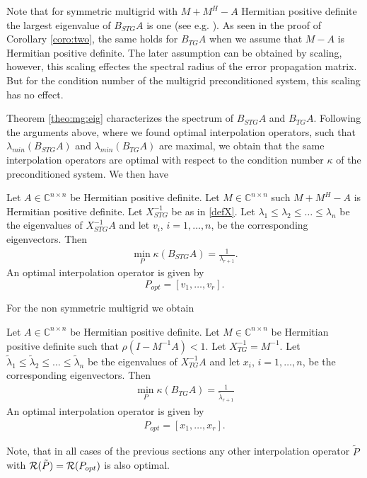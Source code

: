 \documentclass[final]{siamltex}
\newcommand{\beqo}{\begin{eqnarray*}}
\newcommand{\beq}{\begin{eqnarray}}
\newcommand{\eeqo}{\end{eqnarray*}}
\newcommand{\eeq}{\end{eqnarray}}
\numberwithin{equation}{section}
\newcommand{\ran} {{\cal R}}
\newcommand{\inCnn}{\in \mathbb{C}^{n \times n}}
\begin{document}
Note  that for symmetric multigrid with  $M + M^H - A$ Hermitian  positive
definite  the largest eigenvalue of
$B_{STG}A$ is one (see e.g. \cite{Not15}).  As seen in the proof of Corollary
\ref{coro:two}, the same holds  for  $B_{TG}A$ when we assume  that  $M - A$ is
Hermitian  positive definite. The later
assumption can be obtained  by scaling, however, this scaling effectes the
spectral radius of the
error propagation matrix. But for the condition number of the multigrid
preconditioned system, this scaling has no effect.

Theorem \ref{theo:mg:eig} characterizes the  spectrum of $B_{STG}A$ and
$B_{TG}A$. Following the arguments above, where   we found optimal
interpolation operators, such that
$\lambda_{min}(B_{STG}A)$ and $\lambda_{min}(B_{TG}A)$ are maximal, we obtain
that the same interpolation operators are optimal with respect to the condition
number $\kappa$ of the preconditioned system. We then have

 \begin{theorem}
Let  $A\inCnn$  be Hermitian positive definite. Let $ M \inCnn$ such $M + M^H -
A$ is Hermitian positive definite.
Let $X_{STG}^{-1}$  be as in \eqref{defX}.  
 Let $
\lambda_1 \leq \lambda_2 \leq \ldots \leq  \lambda_n $
be the  eigenvalues of $X_{STG}^{-1}A$  and let $v_i$, $i = 1, \ldots, n$, be
the corresponding eigenvectors. Then
\beq
\min_P \kappa(B_{STG}A) = \frac{1}{\lambda_{r+1}}.
\eeq
An optimal interpolation operator is given by 
\[
P_{opt} = [v_{1}, \ldots , v_r].
\]
\end{theorem}
  
For the non symmetric multigrid we obtain

\begin{theorem}
Let  $A\inCnn$  be Hermitian positive definite. Let $ M \inCnn$ be Hermitian
positive definite  such that $\rho(I - M^{-1}A) < 1.$
Let $X_{TG}^{-1} =  M^{-1}$.   
 Let $
\tilde \lambda_1 \leq \tilde \lambda_2 \leq \ldots \leq  \tilde \lambda_n $
be the  eigenvalues of $X_{TG}^{-1}A$  and let $x_i$, $i = 1, \ldots, n$, be
the corresponding eigenvectors. Then
\beqo
\min_P \kappa(B_{TG}A) = \frac{1}{\tilde \lambda_{r+1}}
\eeqo
An optimal interpolation operator is given by 
\beqo
P_{opt} = [x_{1}, \ldots , x_r].
\eeqo
\end{theorem}

Note, that  in all cases of the previous sections any other interpolation
operator $\tilde P$  with  $\ran (\tilde P) = \ran (P_{opt})$ is also optimal.
\end{document}
